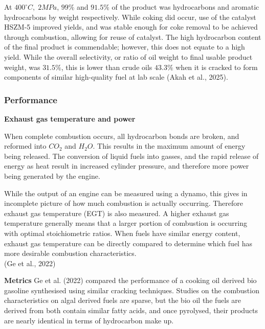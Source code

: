 \documentclass[10pt,a4paper]{article}
\begin{document}
	At $400^\circ C,\; 2MPa$, $99\%$ and $91.5\%$ of the product was hydrocarbons
	and aromatic hydrocarbons by weight respectively. While coking did
	occur, use of the catalyst HSZM-5 improved yields, and was stable enough
	for coke removal to be achieved through combustion, allowing for reuse
	of catalyst. The high hydrocarbon content of the final product is
	commendable; however, this does not equate to a high yield. While the
	overall selectivity, or ratio of oil weight to final usable product
	weight, was $31.5\%$, this is lower than crude oil\textquotesingle s $43.3\%$ when it is cracked to form
	components of similar high-quality fuel at lab scale (Akah et al.,
	2025). 
	
	\subsubsection{Performance}\label{performance}

	\textbf{Exhaust gas temperature and
		power}\label{exhaust-gas-temperature-and-power}
	
	When complete combustion occurs, all hydrocarbon bonds are broken, and
	reformed into $CO_2$ and $H_2O$. This results in the maximum amount of energy
	being released. The conversion of liquid fuels into gasses, and the
	rapid release of energy as heat result in increased cylinder pressure,
	and therefore more \textquotesingle power\textquotesingle{} being
	generated by the engine. 
	
	While the output of an engine can be measured using a dynamo, this gives
	in incomplete picture of how much combustion is actually occurring. 
	Therefore exhaust gas temperature (EGT) is also measured. A higher
	exhaust gas temperature generally means that a larger portion of
	combustion is occurring with optimal stoichiometric ratios. When fuels
	have similar energy content, exhaust gas temperature can be directly
	compared to determine which fuel has more desirable combustion
	characteristics.\\
	(Ge et al., 2022)
	
	\textbf{Metrics}\label{metrics}\newline
	Ge et al. (2022) compared the performance of a cooking oil derived bio
	gasoline synthesised using similar cracking techniques. Studies on the
	combustion characteristics on algal derived fuels are sparse, but the
	bio oil the fuels are derived from both contain similar fatty acids, and
	once pyrolysed, their products are nearly identical in terms of
	hydrocarbon make up. 
	
\end{document}
